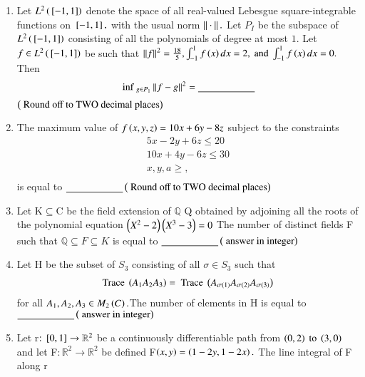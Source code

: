 \documentclass[journal]{IEEEtran}
\begin{document}
\begin{enumerate} [start=53]
\begin{enumerate}
\end{enumerate}
\bigskip
\item Let $L^{2}\left({}\left[-1,1\right]\right)$  denote the space of all real-valued Lebesgue square-integrable functions on ${}\left[-1,1\right],$ with the usual norm $\left\vert\right\vert\cdot\left\vert\right\vert.$ Let $P_{I}$ be the subspace of $L^{2}\left({}\left[-1,1\right]\right)$ consisting of all the polynomials of degree at most $1$. Let
$f\in L^{2}\left({}\left[-1,1\right]\right)$ be such that $\left\vert\left\vert f\right\vert\right\vert^{2}=\frac{18}{5},\int_{-1}^{1}f\left(x\right)dx=2,\text{ and }\int_{-1}^{1}f\left(x\right)dx=0.$ Then 
\begin{align*}
    \text{ inf }_{g\in P_{1}}\left\vert\left\vert f-g\right\vert\right\vert^{2}= \underline{\hspace{2cm}}
\end{align*}
$\left(\text{ Round off to TWO decimal places}\right)$
\bigskip
\item The maximum value of $f\left(x,y,z\right)=10x+6y-8z$ subject to the constraints
\begin{align*}
    5x-2y+6z\leq 20\\10x+4y-6z\leq30\\x,y,a\geq,\\
\end{align*}
is equal to $\underline{\hspace{2cm}} \left(\text{ Round off to TWO decimal places}\right)$
\bigskip
\item Let K$\subseteq$C be the field extension of $\mathbb{Q}$ Q obtained by adjoining all the roots of the polynomial equation $\left(X^{2}-2\right)\left(X^{3}-3\right)=0$ The number of distinct fields F such that $\mathbb{Q}\subseteq{F}\subseteq{K}$ is equal to $\underline{\hspace{2cm}} \left(\text{ answer in integer}\right)$
\bigskip
\item Let H be the subset of $S_{3}$ consisting of all $\sigma\in S_{3}$ such that
\begin{align*}
    \text {Trace }\left(A_{1}A_{2}A_{3}\right)=\text{ Trace }\left(A_{\sigma\left(1\right)}A_{\sigma\left(2\right)}A_{\sigma\left(3\right)}\right)
\end{align*}
for all $A_{1},A_{2},A_{3}\in M_{2}\left(C\right).$The number of elements in H is equal to $\underline{\hspace{2cm}} \left(\text{ answer in integer}\right)$
\bigskip
\item Let r$:{}\left[0,1\right]\to\mathbb{R}^{2}$ be a continuously differentiable path from $\left(0,2\right)\text{ to }\left(3,0\right)$ and let F$:\mathbb{R}^{2}\to\mathbb{R}^{2}$ be defined F$\left(x,y\right)=\left(1-2y,1-2x\right).$ The line integral of F along r 
\begin{align*}

\end{align*}
\end{enumerate}
\end{document}
